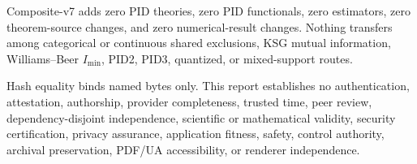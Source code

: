 \documentclass[11pt,a4paper]{article}
\begin{document}
Composite-v7 adds zero PID theories, zero PID functionals, zero estimators, zero theorem-source
changes, and zero numerical-result changes. Nothing transfers among categorical or continuous
shared exclusions, KSG mutual information, Williams--Beer \(I_{\min}\), PID2, PID3, quantized, or
mixed-support routes.

Hash equality binds named bytes only. This report establishes no authentication, attestation,
authorship, provider completeness, trusted time, peer review, dependency-disjoint independence,
scientific or mathematical validity, security certification, privacy assurance, application
fitness, safety, control authority, archival preservation, PDF/UA accessibility, or renderer
independence.
\end{document}
